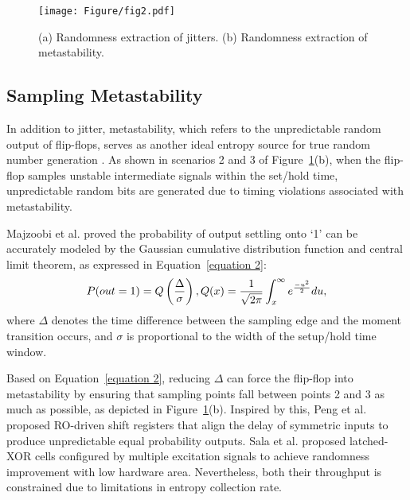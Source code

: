\begin{figure}[htbp]
    \centering
    \texttt{[image: Figure/fig2.pdf]}
    \caption{(a) Randomness extraction of jitters. (b) Randomness extraction of metastability.}
    \label{Figure 2}
     \vspace{-10pt}
\end{figure}
 \subsection{Sampling Metastability}
In addition to jitter, metastability, which refers to the unpredictable random output of flip-flops, serves as another ideal entropy source for true random number generation \cite{JSSC2008, CHES2011}. As shown in scenarios 2 and 3 of Figure~\ref{Figure 2}(b), when the flip-flop samples unstable intermediate signals within the set/hold time,  unpredictable random bits are generated due to timing violations associated with metastability. 

Majzoobi et al. \cite{CHES2011} proved the probability of output settling onto ‘1’ can be accurately modeled by the Gaussian cumulative distribution function and central limit theorem, as expressed in Equation~\eqref{equation 2}: 
\begin{equation}
P(out=1)=Q\left ( \frac{\Delta  }{\sigma }  \right ) ,\\
Q(x)=\frac{1}{\sqrt{2\pi } }\int_{x}^{\infty } e^{\frac{-u^{2} }{2} } du ,
\label{equation 2}
\end{equation}
where $\Delta$ denotes the time difference between the 
sampling edge and the moment transition occurs, and $\sigma$ is proportional to the width of the setup/hold time window. 

Based on Equation~\eqref{equation 2}, reducing $\Delta$ can force the flip-flop into metastability by ensuring that sampling points fall between points 2 and 3 as much as possible, as depicted in Figure~\ref{Figure 2}(b). Inspired by this, Peng et al. \cite{TODAES2023} proposed RO-driven shift registers that align the delay of symmetric inputs to produce unpredictable equal probability outputs. Sala et al. \cite{TCAS1_2022} proposed latched-XOR cells configured by multiple excitation signals to achieve randomness improvement with low hardware area. Nevertheless, both their throughput is constrained due to limitations in entropy collection rate. 


